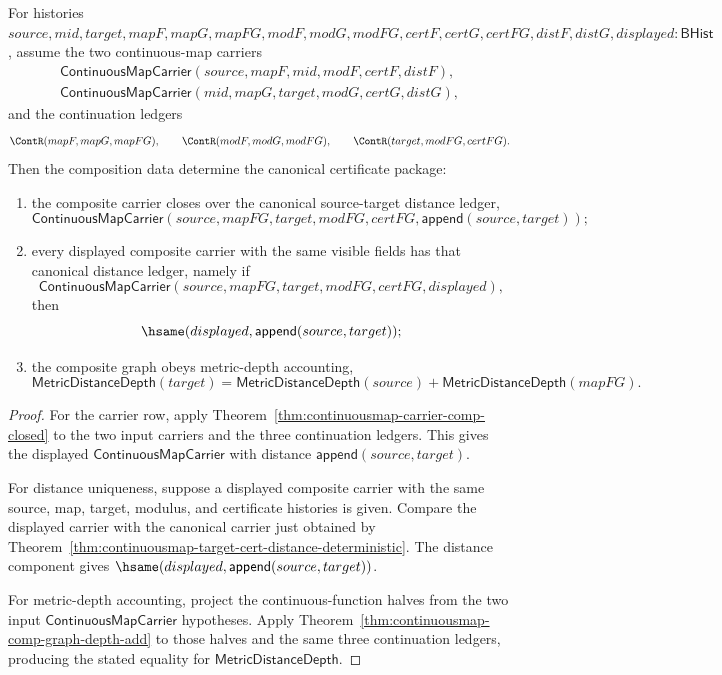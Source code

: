 \begin{theorem}
\label{thm:continuousmap-composition-canonical-certificate-package}
For histories
$source,mid,target,mapF,mapG,mapFG,modF,modG,modFG,certF,certG,certFG,distF,distG,displayed:\mathsf{BHist}$,
assume the two continuous-map carriers
$$
\begin{array}{l}
\mathsf{ContinuousMapCarrier}(source,mapF,mid,modF,certF,distF),\\
\mathsf{ContinuousMapCarrier}(mid,mapG,target,modG,certG,distG),
\end{array}
$$
and the continuation ledgers
$$
\ContR(mapF,mapG,mapFG),\qquad
\ContR(modF,modG,modFG),\qquad
\ContR(target,modFG,certFG).
$$
Then the composition data determine the canonical certificate package:
\begin{enumerate}
\item the composite carrier closes over the canonical source-target distance
ledger,
$$
\mathsf{ContinuousMapCarrier}
(source,mapFG,target,modFG,certFG,\mathsf{append}(source,target));
$$

\item every displayed composite carrier with the same visible fields has that
canonical distance ledger, namely if
$$
\mathsf{ContinuousMapCarrier}(source,mapFG,target,modFG,certFG,displayed),
$$
then
$$
\hsame(displayed,\mathsf{append}(source,target));
$$

\item the composite graph obeys metric-depth accounting,
$$
\mathsf{MetricDistanceDepth}(target)
=
\mathsf{MetricDistanceDepth}(source)+
\mathsf{MetricDistanceDepth}(mapFG).
$$
\end{enumerate}
\end{theorem}
\begin{proof}
For the carrier row, apply
Theorem~\ref{thm:continuousmap-carrier-comp-closed} to the two input carriers
and the three continuation ledgers. This gives the displayed
$\mathsf{ContinuousMapCarrier}$ with distance
$\mathsf{append}(source,target)$.

For distance uniqueness, suppose a displayed composite carrier with the same
source, map, target, modulus, and certificate histories is given. Compare the
displayed carrier with the canonical carrier just obtained by
Theorem~\ref{thm:continuousmap-target-cert-distance-deterministic}. The
distance component gives $\hsame(displayed,\mathsf{append}(source,target))$.

For metric-depth accounting, project the continuous-function halves from the
two input $\mathsf{ContinuousMapCarrier}$ hypotheses. Apply
Theorem~\ref{thm:continuousmap-comp-graph-depth-add} to those halves and the
same three continuation ledgers, producing the stated equality for
$\mathsf{MetricDistanceDepth}$.
\end{proof}

